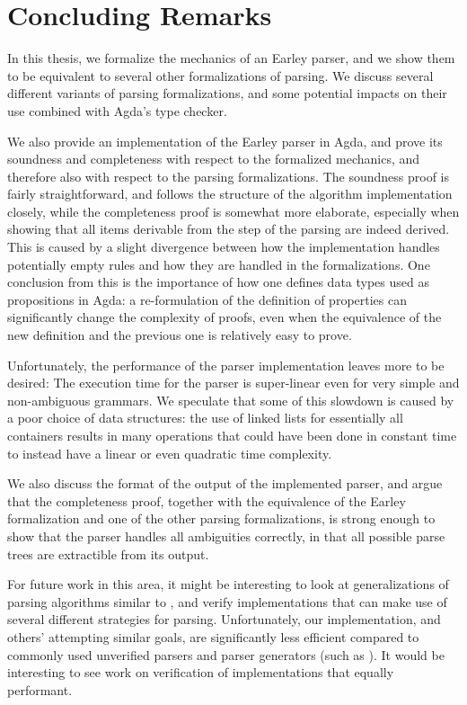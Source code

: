 \chapter{Concluding Remarks}\label{Conclusion}

	In this thesis, we formalize the mechanics of an Earley parser, and we show
	them to be equivalent to several other formalizations of parsing. We
	discuss several different variants of parsing formalizations, and some
	potential impacts on their use combined with Agda's type checker.

	We also provide an implementation of the Earley parser in Agda, and prove
	its soundness and completeness with respect to the formalized mechanics,
	and therefore also with respect to the parsing formalizations. The
	soundness proof is fairly straightforward, and follows the structure of the
	algorithm implementation closely, while the completeness proof is somewhat
	more elaborate, especially when showing that all items derivable from the
	 step of the parsing are indeed derived. This is caused by
	a slight divergence between how the implementation handles potentially
	empty rules and how they are handled in the formalizations. One conclusion
	from this is the importance of how one defines data types used as
	propositions in Agda: a re-formulation of the definition of properties can
	significantly change the complexity of proofs, even when the equivalence of
	the new definition and the previous one is relatively easy to prove.

	Unfortunately, the performance of the parser implementation leaves more to
	be desired: The execution time for the parser is super-linear even for very
	simple and non-ambiguous grammars. We speculate that some of this slowdown
	is caused by a poor choice of data structures: the use of linked lists for
	essentially all containers results in many operations that could have been
	done in constant time to instead have a linear or even quadratic time 
	complexity.

	We also discuss the format of the output of the implemented parser, and
	argue that the completeness proof, together with the equivalence of the
	Earley formalization and one of the other parsing formalizations, is strong
	enough to show that the parser handles all ambiguities correctly, in that
	all possible parse trees are extractible from its output.

	For future work in this area, it might be interesting to look at
	generalizations of parsing algorithms similar to \cite{sikkel97}, and
	verify implementations that can make use of several different strategies
	for parsing. Unfortunately, our implementation, and others' attempting
	similar goals, are significantly less efficient compared to commonly used
	unverified parsers and parser generators (such as \cite{Menhir, Happy,
	Bison}). It would be interesting to see work on verification of
	implementations that equally performant.
